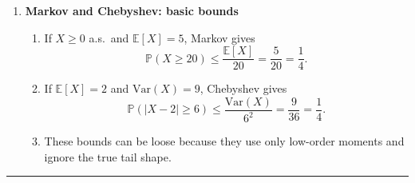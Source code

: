 \documentclass[11pt]{article}
\begin{document}
\begin{enumerate}
Let $X\sim \mathrm{Exp}(1)$ and fix $a>0$. Define $Y=\min(X,a)$.

\begin{enumerate}[label=(\alph*)]
\item For $t<0$, $F_Y(t)=0$.
For $0\le t<a$,
\[
F_Y(t)=\mathbb{P}(\min(X,a)\le t)=\mathbb{P}(X\le t)=1-e^{-t}.
\]
For $t\ge a$, $\min(X,a)\le t$ always, so $F_Y(t)=1$.
Thus
\[
F_Y(t)=
\begin{cases}
0, & t<0,\\
1-e^{-t}, & 0\le t<a,\\
1, & t\ge a.
\end{cases}
\]
There is a jump at $t=a$ of size $\mathbb{P}(Y=a)=\mathbb{P}(X>a)=e^{-a}$.

\item $Y$ has a density on $[0,a)$ equal to $e^{-t}$, but also an \textbf{atom} at $a$:
\[
\mathbb{P}(Y=a)=e^{-a}>0.
\]
So $Y$ is \emph{mixed} (not purely continuous).

\item Using $Y=X\mathbf{1}_{\{X\le a\}}+a\mathbf{1}_{\{X>a\}}$:
\[
\mathbb{E}[Y]=\mathbb{E}[X\mathbf{1}_{X\le a}]+a\,\mathbb{P}(X>a).
\]
Compute
\[
\mathbb{E}[X\mathbf{1}_{X\le a}]
=\int_0^a t e^{-t}\,dt
=1-(a+1)e^{-a},
\qquad
\mathbb{P}(X>a)=e^{-a}.
\]
Hence
\[
\mathbb{E}[Y]=\big(1-(a+1)e^{-a}\big)+a e^{-a}=1-e^{-a}.
\]
\end{enumerate}

\bigskip

\item \textbf{Markov and Chebyshev: basic bounds}

\begin{enumerate}[label=(\alph*)]
\item If $X\ge0$ a.s.\ and $\mathbb{E}[X]=5$, Markov gives
\[
\mathbb{P}(X\ge 20)\le \frac{\mathbb{E}[X]}{20}=\frac{5}{20}=\frac14.
\]

\item If $\mathbb{E}[X]=2$ and $\mathrm{Var}(X)=9$, Chebyshev gives
\[
\mathbb{P}(|X-2|\ge 6)\le \frac{\mathrm{Var}(X)}{6^2}=\frac{9}{36}=\frac14.
\]

\item These bounds can be loose because they use only low-order moments and ignore the true tail shape.
\end{enumerate}

\end{enumerate}

\bigskip
\hrule
\bigskip
\end{document}
